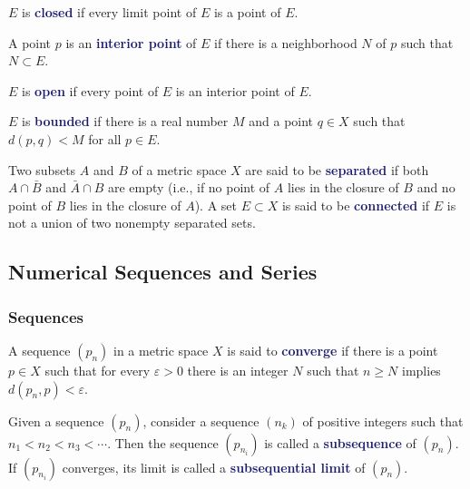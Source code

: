 \documentclass[11pt]{article}
\numberwithin{equation}{section}
\newcommand{\navy}[1]{\textcolor{MidnightBlue}{\bf #1}}
\theoremstyle{definition}
\theoremstyle{definition}
\newcommand{\1}{\mathbbm 1}
\newcommand{\e}{\varepsilon}
\begin{document}
\begin{definition}[Closed]
	$E$ is \navy{closed} if every limit point of $E$ is a point of $E$.
\end{definition}

\begin{definition}[Interior]
	A point $p$ is an \navy{interior point} of $E$ if there is a neighborhood $N$ of $p$ such that $N \subset E$.
\end{definition}

\begin{definition}[Open]
	$E$ is \navy{open} if every point of $E$ is an interior point of $E$.
\end{definition}

\begin{definition}[Bounded]
	$E$ is \navy{bounded} if there is a real number $M$ and a point $q \in X$ such that $d(p,q) < M$ for all $p \in E$.
\end{definition}

\begin{definition}
	Two subsets $A$ and $B$ of a metric space $X$ are said to be \navy{separated} if both $A \cap \bar{B}$ and $\bar{A} \cap B$ are empty (i.e., if no point of $A$ lies in the closure of $B$ and no point of $B$ lies in the closure of $A$). A set $E \subset X$ is said to be \navy{connected} if $E$ is not a union of two nonempty separated sets. 
\end{definition}

\subsection{Numerical Sequences and Series}

\subsubsection{Sequences}

\begin{definition}
	A sequence $(p_n)$ in a metric space $X$ is said to \navy{converge} if there is a point $p \in X$ such that for every $\e > 0$ there is an integer $N$ such that $n \geq N$ implies $d(p_n,p) < \e$. 
\end{definition}

\begin{definition}
	Given a sequence $(p_n)$, consider a sequence $(n_k)$ of positive integers such that $n_1 < n_2 < n_3 < \cdots $. Then the sequence $(p_{n_i})$ is called a \navy{subsequence} of $(p_n)$. If $(p_{n_i})$ converges, its limit is called a \navy{subsequential limit} of $(p_n)$.
\end{definition}
\end{document}
